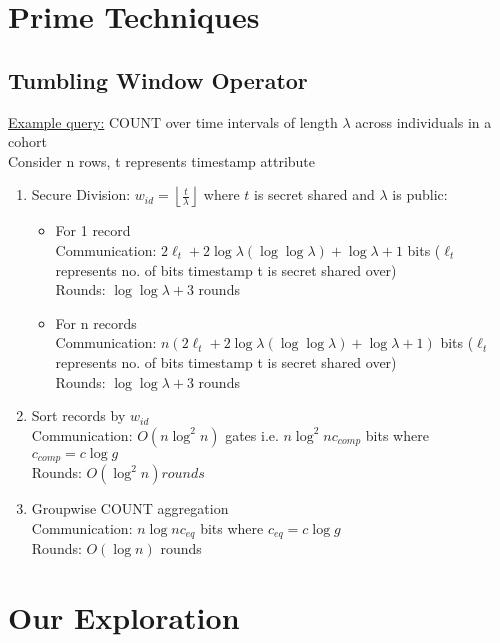 \section{Prime Techniques}

\subsection{Tumbling Window Operator}
\underline{Example query:} COUNT over time intervals of length $\lambda$ across individuals in a cohort \\
Consider n rows, t represents timestamp attribute 
\begin{enumerate}
\item Secure Division: $w_{id} = \left\lfloor \frac{t}{\lambda} \right\rfloor$ where $t$ is secret shared and $\lambda$ is public:
\begin{itemize}
\item For 1 record \\
Communication: $2\ell_{t} + 2\log \lambda (\log \log \lambda) + \log \lambda + 1$ bits ($\ell_{t}$ represents no. of bits timestamp t is secret shared over) \\
Rounds: $\log \log \lambda + 3$ rounds
\item For n records \\
Communication: $n(2\ell_{t} + 2\log \lambda (\log \log \lambda) + \log \lambda + 1)$ bits ($\ell_{t}$ represents no. of bits timestamp t is secret shared over) \\
Rounds: $\log \log \lambda + 3$ rounds
\end{itemize}
\item Sort records by $w_{id}$ \\
Communication: $O(n \log^2 n)$ gates i.e. $n \log^2 n c_{comp}$ bits where $c_{comp} = c \log g$ \\
Rounds: $O(\log^2 n) rounds$
\item Groupwise COUNT aggregation  \\
Communication: $n \log n c_{eq}$ bits where $c_{eq} = c \log g$ \\
Rounds: $O(\log n)$ rounds
\end{enumerate}

\section{Our Exploration}

